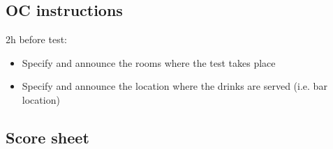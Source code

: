 \subsection{OC instructions}

2h before test:
\begin{itemize}
	\item Specify and announce the rooms where the test takes place
	\item Specify and announce the location where the drinks are served (i.e. bar location)
\end{itemize}

\newpage
\subsection{Score sheet}


